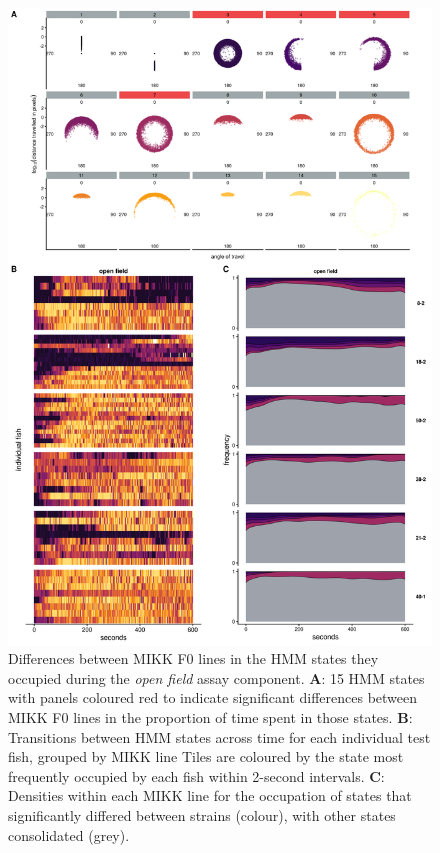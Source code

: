 \documentclass[
]{book}
\begin{document}
\begin{figure}
\includegraphics[width=1\linewidth]{figs/mikk_behaviour/select_0.08_15_sge_of} \caption{Differences between MIKK F0 lines in the HMM states they occupied during the \emph{open field} assay component. \textbf{A}: 15 HMM states with panels coloured red to indicate significant differences between MIKK F0 lines in the proportion of time spent in those states. \textbf{B}: Transitions between HMM states across time for each individual test fish, grouped by MIKK line Tiles are coloured by the state most frequently occupied by each fish within 2-second intervals. \textbf{C}: Densities within each MIKK line for the occupation of states that significantly differed between strains (colour), with other states consolidated (grey).}\label{fig:F2-time-sge-of}
\end{figure}
\end{document}
